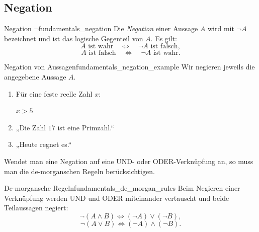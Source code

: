\subsection{Negation}
\label{subsec:fundamentals_negation}

\begin{DefinitionBox}{Negation $\neg$}{fundamentals_negation}
  Die \emph{Negation}  einer Aussage $A$ wird mit
  $\neg A$ bezeichnet und ist das logische Gegenteil von $A$. Es gilt:
  \[
    A\text{ ist wahr}
    \quad\Longleftrightarrow\quad
    \neg A\text{ ist falsch},
  \]
  \[
    A\text{ ist falsch}
    \quad\Longleftrightarrow\quad
    \neg A\text{ ist wahr}.
  \]
\end{DefinitionBox}

\begin{ExampleBox}{Negation von Aussagen}{fundamentals_negation_example}
  Wir negieren jeweils die angegebene Aussage $A$.
  \begin{enumerate}[label=\alph*),itemsep=0.8em]
    \item Für eine feste reelle Zahl $x$:
      \par\smallskip
      $x>5$\\[0.4em]

    \item
      \par\smallskip
      „Die Zahl $17$ ist eine Primzahl.“\\[0.4em]

    \item
      \par\smallskip
      „Heute regnet es.“\\[0.4em]
  \end{enumerate}
\end{ExampleBox}


Wendet man eine Negation auf eine UND- oder ODER-Verknüpfung an, so muss man die
de-morganschen Regeln berücksichtigen.

\begin{TheoremBox}{De-morgansche Regeln}{fundamentals_de_morgan_rules}
  Beim Negieren einer Verknüpfung werden UND und ODER miteinander vertauscht
  und beide Teilaussagen negiert:
  \[
    \neg(A\land B)\Leftrightarrow (\neg A)\lor(\neg B),
  \]
  \[
    \neg(A\lor B)\Leftrightarrow (\neg A)\land(\neg B).
  \]
\end{TheoremBox}

